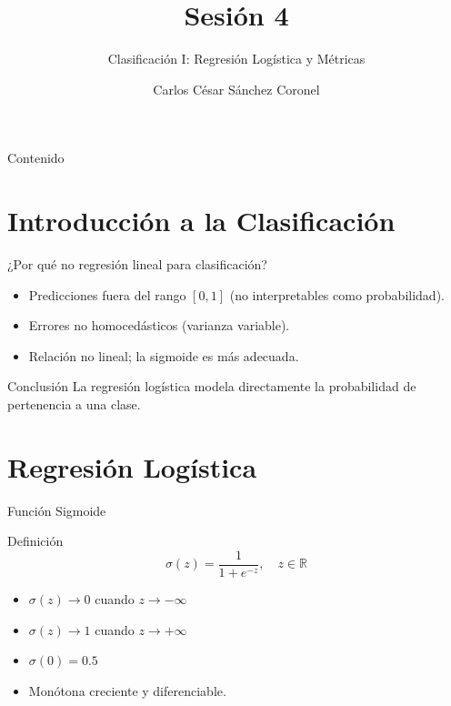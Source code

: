 \documentclass[aspectratio=169, 10pt, xcolor=table]{beamer}
\title[SESIÓN 4]{\textbf{Sesión 4}}
\subtitle{Clasificación I: Regresión Logística y Métricas}
\author[Prof. C. Sánchez]{Carlos César Sánchez Coronel}
\institute{\textbf{MACHINE LEARNING}}
\date{}
\begin{document}
\begin{frame}
    \titlepage
\end{frame}

\begin{frame}{Contenido}
    \tableofcontents
\end{frame}

\section{Introducción a la Clasificación}

\begin{frame}{¿Por qué no regresión lineal para clasificación?}
    \begin{itemize}
        \item Predicciones fuera del rango $[0,1]$ (no interpretables como probabilidad).
        \item Errores no homocedásticos (varianza variable).
        \item Relación no lineal; la sigmoide es más adecuada.
    \end{itemize}
    \vspace{0.3cm}
    \begin{exampleblock}{Conclusión}
        La regresión logística modela directamente la probabilidad de pertenencia a una clase.
    \end{exampleblock}
\end{frame}

\section{Regresión Logística}

\begin{frame}{Función Sigmoide}
    \begin{block}{Definición}
        \[
        \sigma(z) = \frac{1}{1 + e^{-z}}, \quad z \in \mathbb{R}
        \]
        \begin{itemize}
            \item $\sigma(z) \to 0$ cuando $z \to -\infty$
            \item $\sigma(z) \to 1$ cuando $z \to +\infty$
            \item $\sigma(0) = 0.5$
            \item Monótona creciente y diferenciable.
        \end{itemize}
    \end{block}
\end{frame}
\end{document}
